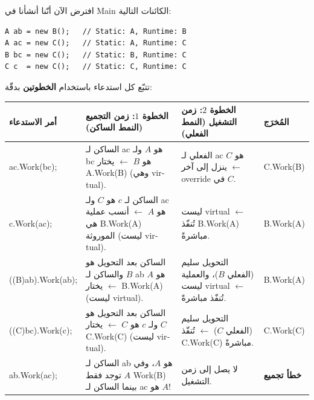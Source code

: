 \documentclass[14pt]{extarticle}
\begin{document}
افترض الآن أنّنا أنشأنا في \textenglish{Main} الكائنات التالية:

\begin{boxCode}
\begin{english}
\begin{verbatim}
A ab = new B();   // Static: A, Runtime: B
A ac = new C();   // Static: A, Runtime: C
B bc = new C();   // Static: B, Runtime: C
C c  = new C();   // Static: C, Runtime: C
\end{verbatim}
\end{english}
\end{boxCode}

تتبّع كل استدعاء باستخدام \textbf{الخطوتين} بدقّة:

{\renewcommand{\arraystretch}{1.25}
\small
\begin{longtable}{|>{\raggedright\arraybackslash}p{}|>{\raggedleft\arraybackslash}p{}|>{\raggedleft\arraybackslash}p{}|>{\raggedright\arraybackslash}p{}|}
\hline
\textbf{أمر الاستدعاء} & \textbf{الخطوة $1$: زمن التجميع (النمط الساكن)} & \textbf{الخطوة $2$: زمن التشغيل (النمط الفعلي)} & \textbf{المُخرَج} \\
\hline
\endhead

\textenglish{ac.Work(bc);} &
الساكن لـ \textenglish{ac} هو $A$ ولـ \textenglish{bc} هو $B$ $\leftarrow$ يختار \textenglish{A.Work(B)} (وهي \textenglish{virtual}). &
الفعلي لـ \textenglish{ac} هو $C$ $\leftarrow$ ينزل إلى آخر \textenglish{override} في $C$. &
\textenglish{C.Work(B)} \\
\hline

\textenglish{c.Work(ac);} &
الساكن لـ $c$ هو $C$ ولـ \textenglish{ac} هو $A$ $\leftarrow$ أنسب عملية هي \textenglish{B.Work(A)} الموروثة (ليست \textenglish{virtual}). &
ليست \textenglish{virtual} $\leftarrow$ تُنفّذ \textenglish{B.Work(A)} مباشرةً. &
\textenglish{B.Work(A)} \\
\hline

\textenglish{((B)ab).Work(ab);} &
الساكن بعد التحويل هو $B$ والساكن لـ \textenglish{ab} هو $A$ $\leftarrow$ يختار \textenglish{B.Work(A)} (ليست \textenglish{virtual}). &
التحويل سليم (الفعلي $B$)، والعملية ليست \textenglish{virtual} $\leftarrow$ تُنفّذ مباشرةً. &
\textenglish{B.Work(A)} \\
\hline

\textenglish{((C)bc).Work(c);} &
الساكن بعد التحويل هو $C$ ولـ $c$ هو $C$ $\leftarrow$ يختار \textenglish{C.Work(C)} (ليست \textenglish{virtual}). &
التحويل سليم (الفعلي $C$) $\leftarrow$ تُنفّذ \textenglish{C.Work(C)} مباشرةً. &
\textenglish{C.Work(C)} \\
\hline

\textenglish{ab.Work(ac);} &
الساكن لـ \textenglish{ab} هو $A$، وفي $A$ توجد فقط \textenglish{Work(B)} بينما الساكن لـ \textenglish{ac} هو $A$! &
لا يصل إلى زمن التشغيل. &
\textarabic{\textbf{خطأ تجميع}} \\
\hline
\end{longtable}}
\end{document}
